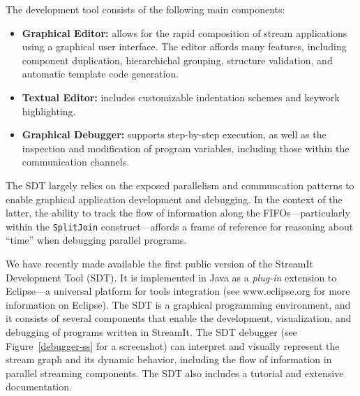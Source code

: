 \documentclass{csailabstractbook}
\begin{document}
The  development  tool consists  of the following main components:
\begin{itemize}
\item {\bf Graphical Editor:} allows for the rapid composition of
stream applications using a graphical user interface. The editor
affords many features, including  component duplication, hierarchichal
grouping, structure validation, and automatic template code generation.
\item {\bf Textual Editor:} includes customizable indentation
schemes and keywork highlighting.
\item {\bf Graphical Debugger:} supports step-by-step execution, as well as
the inspection and modification  of program variables, including those
within the communication channels.
\end{itemize}

The  SDT largely relies  on the  exposed parallelism  and communcation
patterns to enable graphical application development and debugging. In
the  context  of  the  latter,  the  ability  to  track  the  flow  of
information along the  FIFOs---particularly within the {\tt SplitJoin}
construct---affords a frame of  reference for reasoning about ``time''
when debugging parallel programs.





We  have recently  made  available  the first  public  version of  the
StreamIt Development Tool (SDT).  It  is implemented in Java as a {\it
plug-in}  extension  to   Eclipse---a  universal  platform  for  tools
integration  (see www.eclipse.org  for more  information  on Eclipse).
The SDT  is a  graphical programming environment,  and it  consists of
several  components that  enable the  development,  visualization, and
debugging  of programs  written in  StreamIt.  The  SDT  debugger (see
Figure~\ref{debugger-ss} for a  screenshot) can interpret and visually
represent  the stream graph  and its  dynamic behavior,  including the
flow of  information in parallel  streaming components.  The  SDT also
includes a tutorial and extensive documentation.
\end{document}
